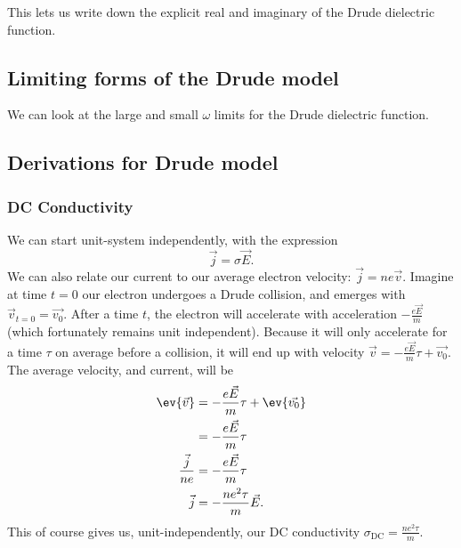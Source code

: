 \documentclass[../../main.tex]{subfiles}
\newcommand{\sigmaDC}{\sigma_{\textrm{DC}}}
\begin{document}
This lets us write down the explicit real and imaginary of the Drude dielectric function.

\subsection{Limiting forms of the Drude model}
We can look at the large and small $\omega$ limits for the Drude dielectric function.

\subsection{Derivations for Drude model}

\subsubsection{DC Conductivity}
We can start unit-system independently, with the expression 
\begin{equation}
	{\vec{j}} = \sigma \vec{E}. \label{eq:DrudeTheory:ConductivityDef}
\end{equation}
We can also relate our current to our average electron velocity: $\vec{j} = n e \vec{v}$. Imagine at time $t = 0$ our electron undergoes a Drude collision, and emerges with $\vec{v}_{t = 0} = \vec{v_0}$. After a time $t$, the electron will accelerate with acceleration $-\frac{e \vec{E}}{m}$ (which fortunately remains unit independent). Because it will only accelerate for a time $\tau$ on average before a collision, it will end up with velocity $\vec{v} = -\frac{e \vec{E}}{m}\tau + \vec{v_0}$. The average velocity, and current, will be 
\begin{align}
	\ev{\vec{v}} &= - \frac{e \vec{E}}{m}\tau + \ev{\vec{v_0}} \\
	&= - \frac{e \vec{E}}{m}\tau \\
	\frac{\vec{j}}{ne} &= - \frac{e \vec{E}}{m}\tau \\
	\vec{j} &= - \frac{n e^2 \tau}{m} \vec{E}.
\end{align}
This of course gives us, unit-independently, our DC conductivity $\sigmaDC = \frac{n e^2 \tau}{m}$. 	
\end{document}
